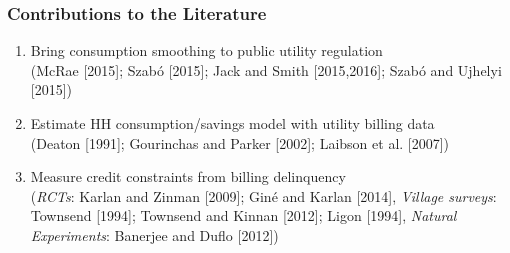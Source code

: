 \documentclass[aspectratio=149]{beamer}
\begin{document}
\begin{frame}
\frametitle{Contributions to the Literature}

\begin{enumerate}
\item Bring consumption smoothing to public utility regulation \\
{\footnotesize (McRae [2015]; Szab\'o [2015]; Jack and Smith [2015,2016]; Szab\'o and Ujhelyi [2015])}
\vspace{2mm}


\item Estimate HH consumption/savings model with utility billing data \\
{\footnotesize (Deaton [1991]; Gourinchas and Parker [2002]; Laibson et al. [2007])}
\vspace{2mm}

\item Measure credit constraints from billing delinquency \\
{ \footnotesize (\textit{RCTs}: Karlan and Zinman [2009]; Gin\'e and Karlan [2014],  \textit{Village surveys}: Townsend [1994]; Townsend and Kinnan [2012]; Ligon [1994], \textit{Natural Experiments}: Banerjee and Duflo [2012]) }




\end{enumerate}

\end{frame}
\end{document}
